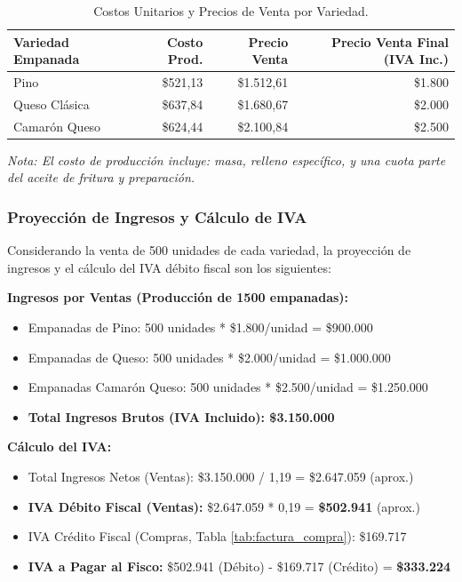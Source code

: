\documentclass[12pt]{article}
\begin{document}
        \begin{table}[H]
            \centering
            \small
            \begin{tabular}{|l|r|r|r|}
                \hline
                \textbf{Variedad Empanada} & \textbf{Costo Prod.} & \textbf{Precio Venta} & \textbf{Precio Venta Final (IVA Inc.)} \\
                \hline
                Pino & \$521,13 & \$1.512,61 & \$1.800 \\
                Queso Clásica & \$637,84 & \$1.680,67 & \$2.000 \\
                Camarón Queso & \$624,44 & \$2.100,84 & \$2.500 \\
                \hline
            \end{tabular}
            \caption{Costos Unitarios y Precios de Venta por Variedad.}
            \label{tab:precios_venta}
        \end{table}
        \textit{Nota: El costo de producción incluye: masa, relleno específico, y una cuota parte del aceite de fritura y preparación.}

        \subsubsection{Proyección de Ingresos y Cálculo de IVA}
        Considerando la venta de 500 unidades de cada variedad, la proyección de ingresos y el cálculo del IVA débito fiscal son los siguientes:

        \textbf{Ingresos por Ventas (Producción de 1500 empanadas):}
        \begin{itemize}
            \item Empanadas de Pino: 500 unidades * \$1.800/unidad = \$900.000
            \item Empanadas de Queso: 500 unidades * \$2.000/unidad = \$1.000.000
            \item Empanadas Camarón Queso: 500 unidades * \$2.500/unidad = \$1.250.000
            \item \textbf{Total Ingresos Brutos (IVA Incluido): \$3.150.000}
        \end{itemize}

        \textbf{Cálculo del IVA:}
        \begin{itemize}
            \item Total Ingresos Netos (Ventas): \$3.150.000 / 1,19 = \$2.647.059 (aprox.)
            \item \textbf{IVA Débito Fiscal (Ventas):} \$2.647.059 * 0,19 = \textbf{\$502.941} (aprox.)
            \item IVA Crédito Fiscal (Compras, Tabla \ref{tab:factura_compra}): \$169.717
            \item \textbf{IVA a Pagar al Fisco:} \$502.941 (Débito) - \$169.717 (Crédito) = \textbf{\$333.224}
        \end{itemize}
        
\end{document}
